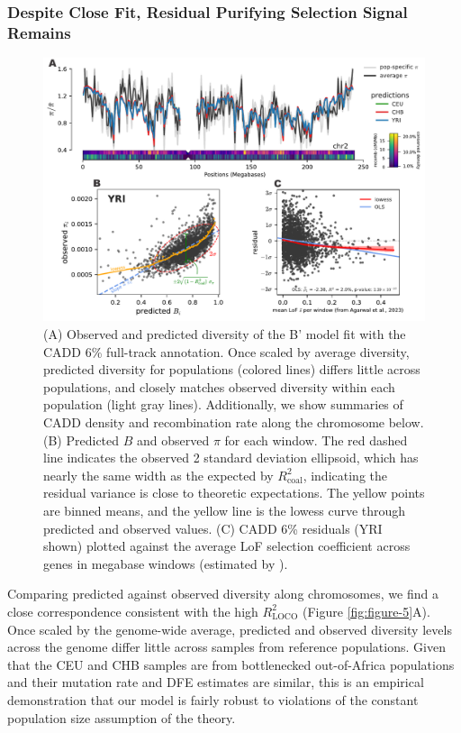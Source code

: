 \documentclass[11pt]{article}
\begin{document}
\subsubsection*{Despite Close Fit, Residual Purifying Selection Signal Remains}

\begin{figure}[htbp] \centering
    \includegraphics[width=\textwidth]{figures/figure_6.pdf} 

    \caption{(A) Observed and predicted diversity of the B' model fit with the
       CADD 6\% full-track annotation. Once scaled by average diversity, predicted diversity for populations (colored lines) differs little across populations, and closely matches observed diversity within each population (light gray lines). Additionally, we show
        summaries of CADD density and recombination rate along the chromosome
        below. (B) Predicted $B$ and observed $\pi$ for each window. The red dashed line indicates the observed 2 standard deviation ellipsoid, which has nearly the same width as the expected by $R_\text{coal}^2$, indicating the residual variance is close to theoretic expectations. The yellow points are binned means, and the yellow line is the lowess curve through predicted and observed values. (C) CADD 6\% residuals (YRI shown) plotted against the average LoF selection coefficient across genes in megabase windows (estimated by \cite{Agarwal2023-un}).}

  \label{fig:figure-6}
\end{figure}

Comparing predicted against observed diversity along chromosomes, we find a close
correspondence consistent with the high $R_\text{LOCO}^2$ (Figure \ref{fig:figure-5}A). Once scaled by the genome-wide average, predicted and observed diversity levels across the genome differ little across samples from reference populations. Given that the CEU and CHB samples are from bottlenecked out-of-Africa populations and their mutation rate and DFE estimates are similar, this is an empirical demonstration that our model is fairly robust to violations of the constant population size assumption of the theory.
\end{document}

